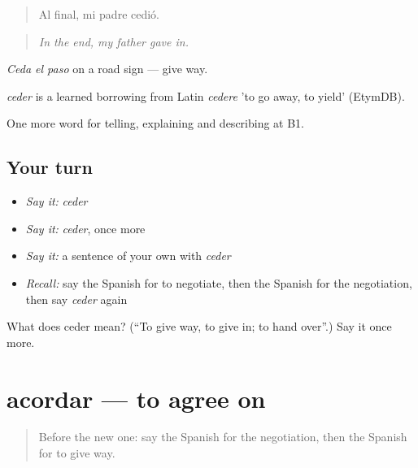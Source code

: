 \begin{quote}
Al final, mi padre cedió.
\end{quote}

\begin{quote}
\emph{In the end, my father gave in.}
\end{quote}

\emph{Ceda el paso} on a road sign — give way.

\begin{cousinweb}
\emph{ceder} is a learned borrowing from Latin \emph{cedere} 'to go away, to yield' (EtymDB).
\end{cousinweb}

\begin{grammarlens}[title={What you've built}]
One more word for telling, explaining and describing at B1.
\end{grammarlens}

\subsection*{Your turn}
\begin{itemize}
\raggedright
  \item \emph{Say it:} \emph{ceder}
  \item \emph{Say it:} \emph{ceder}, once more
  \item \emph{Say it:} a sentence of your own with \emph{ceder}
  \item \emph{Recall:} say the Spanish for to negotiate, then the Spanish for the negotiation, then say \emph{ceder} again
\end{itemize}

\begin{tcolorbox}[breakable,colback=teal!4,colframe=teal!35!black,title={Before you move on}]
What does ceder mean? (\textquotedblleft{}To give way, to give in; to hand over\textquotedblright{}.) Say it once more.
\end{tcolorbox}
\section[acordar]{acordar — to agree on}

\label{lesson:ES-C634-acordar}



\begin{quote}
Before the new one: say the Spanish for the negotiation, then the Spanish for to give way.
\end{quote}

